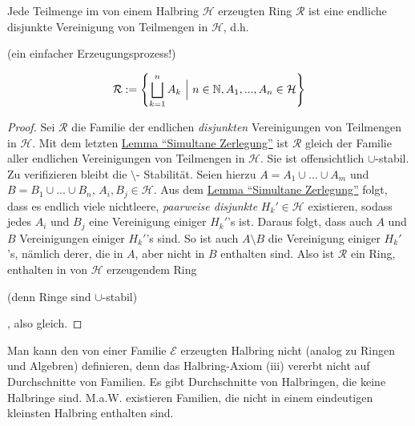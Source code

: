 \begin{proposition}
\begin{mdframed}
Jede Teilmenge im von einem Halbring $\mathcal{H}$ erzeugten Ring $\mathcal{R}$ ist eine endliche disjunkte Vereinigung von Teilmengen in $\mathcal{H}$, d.h. \begin{scriptsize}(ein einfacher Erzeugungsprozess!)\end{scriptsize}
\begin{equation}
\mathcal{R} := \left\{ \bigsqcup_{k=1}^n A_k \  \Big\rvert \ n\in \mathbb{N}, A_1,...,A_n \in \mathcal{H} \right\}
\label{eqI14}
\end{equation}
\end{mdframed}
\begin{proof}
Sei $\mathcal{R}$ die Familie der endlichen \emph{disjunkten} Vereinigungen von Teilmengen in $\mathcal{H}$. Mit dem letzten \hyperref[lemmaA]{Lemma ``Simultane Zerlegung''} ist $\mathcal{R}$ gleich der Familie aller endlichen Vereinigungen von Teilmengen in $\mathcal{H}$. Sie ist offensichtlich $\cup$-stabil. Zu verifizieren bleibt die $\setminus$- Stabilität. Seien hierzu $A = A_1 \cup ... \cup A_m$ und $B = B_1 \cup ... \cup B_n$, $A_i, B_j \in \mathcal{H}$. Aus dem \hyperref[lemmaA]{Lemma ``Simultane Zerlegung''} folgt, dass es endlich viele nichtleere, \emph{paarweise disjunkte} $H_k' \in \mathcal{H}$ existieren, sodass jedes $A_i$ und $B_j$ eine Vereinigung einiger $H_k'$'s ist. Daraus folgt, dass auch $A$ und $B$ Vereinigungen einiger $H_k'$'s sind. So ist auch $A\setminus B$ die Vereinigung einiger $H_k'$'s, nämlich derer, die in $A$, aber nicht in $B$ enthalten sind. Also ist $\mathcal{R}$ ein Ring, enthalten in von $\mathcal{H}$ erzeugendem Ring\begin{scriptsize}(denn Ringe sind $\cup$-stabil)\end{scriptsize}, also gleich.
\end{proof}
\end{proposition}

\begin{remark}
Man kann den von einer Familie $\mathcal{E}$ erzeugten Halbring nicht (analog zu Ringen und Algebren) definieren, denn das Halbring-Axiom (iii) vererbt nicht auf Durchschnitte von Familien. Es gibt Durchschnitte von Halbringen, die keine Halbringe sind. M.a.W. existieren Familien, die nicht in einem eindeutigen kleinsten Halbring enthalten sind.
\end{remark}

